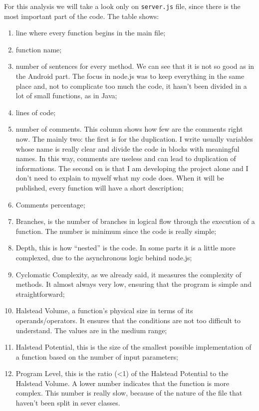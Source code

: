For this analysis we will take a look only on \texttt{server.js} file, since there is the most important part of the code. The table shows:
\begin{enumerate}
\item line where every function begins in the main file;
\item function name;
\item number of sentences for every method. We can see that it is not so good as in the Android part. The focus in node.js was to keep everything in the same place and, not to complicate too much the code, it hasn't been divided in a lot of small functions, as in Java;
\item lines of code;
\item number of comments. This column shows how  few are the comments right now. The mainly two: the first is for the duplication. I write usually variables whose name is really clear and divide the code in blocks with meaningful names. In this way, comments are useless and can lead to duplication of informations. The second on is that I am developing the project alone and I don't need to explain to myself what my code does. When it will be published, every function will have a short description;
\item Comments percentage;
\item Branches, is the number of branches in logical flow through the execution of a function. The number is minimum since the code is really simple;
\item Depth, this is how ``nested'' is the code. In some parts it is a little more complexed, due to the asynchronous logic behind node.js;
\item Cyclomatic Complexity, as we already said, it measures the complexity of methods. It almost always very low, ensuring that the program is simple and straightforward;
\item Halstead Volume, a function's physical size in terms of its operands/operators. It ensures that the conditions are not too difficult to understand. The values are in the medium range;
\item Halstead Potential, this is the size of the smallest possible implementation of a function based on the number of input parameters;
\item Program Level, this is the ratio (<1) of the Halstead Potential to the Halstead Volume. A lower number indicates that the function is more complex. This number is really slow, because of the nature of the file that haven't been split in sever classes.
\end{enumerate}

